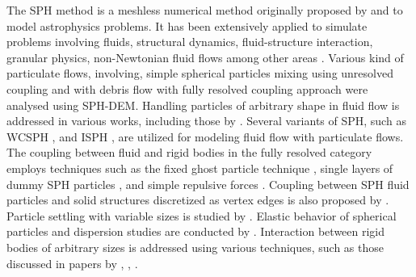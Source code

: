 \documentclass[preprint,12pt]{elsarticle}
\begin{document}
The SPH method is a meshless numerical method originally proposed by
\citet{gingold1977smoothed} and \citet{lucy1977numerical} to model
astrophysics problems. It has been extensively applied to simulate problems
involving fluids, structural dynamics, fluid-structure interaction, granular
physics, non-Newtonian fluid flows \cite{peng2021fully} among other areas
\cite{monaghan2012smoothed}.  Various kind of particulate flows, involving,
simple spherical particles mixing using unresolved coupling
\cite{cleary2015prediction, markauskas2019coupled} and with debris flow
\cite{canelas2016sph} with fully resolved coupling approach were analysed
using SPH-DEM.  Handling particles of arbitrary shape in fluid flow is
addressed in various works, including those by \citet{peng2021fully,
  canelas2016sph, amicarelli2015smoothed}.  Several variants of SPH, such as
WCSPH \cite{peng2021fully, cleary2015prediction}, and ISPH
\cite{asai2021fluid}, are utilized for modeling fluid flow with particulate
flows. The coupling between fluid and rigid bodies in the fully resolved
category employs techniques such as the fixed ghost particle technique
\cite{canelas2016sph, asai2021fluid}, single layers of dummy SPH particles
\cite{peng2021fully}, and simple repulsive forces
\cite{monaghan2009sph}. Coupling between SPH fluid particles and solid
structures discretized as vertex edges is also proposed by
\citet{park2023new}. Particle settling with variable sizes is studied by
\citet{zou2022study}.  Elastic behavior of spherical particles and dispersion
studies are conducted by \citet{ng2021numerical}.  Interaction between rigid
bodies of arbitrary sizes is addressed using various techniques, such as those
discussed in papers by \citet{asai2021fluid}, \citet{peng2021fully},
\citet{canelas2016sph}.
\end{document}
